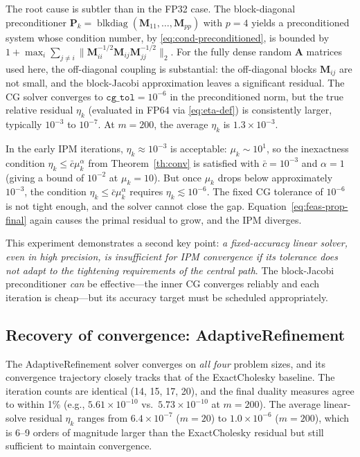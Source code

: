 \documentclass[11pt,twoside]{article}
\newcommand{\bA}{\mathbf{A}}
\newcommand{\bM}{\mathbf{M}}
\newcommand{\bP}{\mathbf{P}}
\newcommand{\blkdiag}{\operatorname{blkdiag}}
\begin{document}
The root cause is subtler than in the FP32 case.  The block-diagonal
preconditioner $\bP_k = \blkdiag(\bM_{11},\dots,\bM_{pp})$ with $p=4$
yields a preconditioned system whose condition number, by
\eqref{eq:cond-preconditioned}, is bounded by $1 + \max_i
\sum_{j\ne i}\|\bM_{ii}^{-1/2}\bM_{ij}\bM_{jj}^{-1/2}\|_2$.  For the
fully dense random $\bA$ matrices used here, the off-diagonal coupling
is substantial: the off-diagonal blocks $\bM_{ij}$ are not small, and
the block-Jacobi approximation leaves a significant residual.  The CG
solver converges to $\texttt{cg\_tol} = 10^{-6}$ in the preconditioned
norm, but the true relative residual $\eta_k$ (evaluated in FP64 via
\eqref{eq:eta-def}) is consistently larger, typically $10^{-3}$ to
$10^{-7}$.  At $m=200$, the average $\eta_k$ is $1.3\times 10^{-3}$.

In the early IPM iterations, $\eta_k \approx 10^{-3}$ is acceptable:
$\mu_k \sim 10^1$, so the inexactness condition $\eta_k \le
\bar{c}\mu_k^\alpha$ from Theorem~\ref{th:conv} is satisfied with
$\bar{c}=10^{-3}$ and $\alpha=1$ (giving a bound of $10^{-2}$ at
$\mu_k=10$).  But once $\mu_k$ drops below approximately $10^{-3}$, the
condition $\eta_k \le \bar{c}\mu_k^\alpha$ requires $\eta_k \lesssim
10^{-6}$.  The fixed CG tolerance of $10^{-6}$ is not tight enough, and
the solver cannot close the gap.  Equation~\eqref{eq:feas-prop-final}
again causes the primal residual to grow, and the IPM diverges.

This experiment demonstrates a second key point: \emph{a fixed-accuracy
linear solver, even in high precision, is insufficient for IPM
convergence if its tolerance does not adapt to the tightening
requirements of the central path}.  The block-Jacobi preconditioner
\emph{can} be effective—the inner CG converges reliably and each
iteration is cheap—but its accuracy target must be scheduled
appropriately.

\subsection{Recovery of convergence: AdaptiveRefinement}

The AdaptiveRefinement solver converges on \emph{all four} problem sizes,
and its convergence trajectory closely tracks that of the ExactCholesky
baseline.  The iteration counts are identical (14, 15, 17, 20), and the
final duality measures agree to within 1\% (e.g., $5.61\times 10^{-10}$
vs.\ $5.73\times 10^{-10}$ at $m=200$).  The average linear-solve
residual $\eta_k$ ranges from $6.4\times 10^{-7}$ ($m=20$) to
$1.0\times 10^{-6}$ ($m=200$), which is 6--9 orders of magnitude larger
than the ExactCholesky residual but still sufficient to maintain
convergence.
\end{document}
